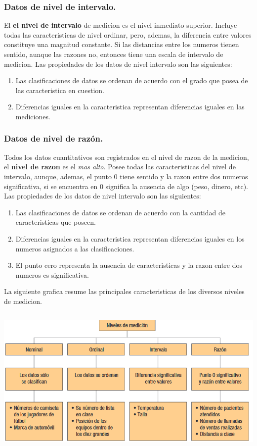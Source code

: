 \documentclass[]{article}
\begin{document}
\subsubsection*{Datos de nivel de intervalo.}
El \textbf{el nivel de intervalo} de medicion es el nivel inmediato superior. Incluye todas las caracteristicas de nivel ordinar, pero, ademas, la diferencia entre valores constituye una magnitud constante. Si las distancias entre los numeros tienen sentido, aunque las razones no, entonces tiene una escala de intervalo de medicion. Las propiedades de los datos de nivel intervalo son las siguientes:
\begin{enumerate}
	\item Las clasificaciones de datos se ordenan de acuerdo con el grado que posea de las caracteristica en cuestion.
	\item Diferencias iguales en la caracteristica representan diferencias iguales en las mediciones.
\end{enumerate}

\subsubsection*{Datos de nivel de razón.}
Todos los datos cuantitativos son registrados en el nivel de razon de la medicion, el \textbf{nivel de razon} es el \textit{mas alto}. Posee todas las caracteristicas del nivel de intervalo, aunque, ademas, el punto 0 tiene sentido y la razon entre dos numeros significativa, si se encuentra en 0 significa la ausencia de algo (peso, dinero, etc). Las propiedades de los datos de nivel intervalo son las siguientes:
\begin{enumerate}
	\item Las clasificaciones de datos se ordenan de acuerdo con la cantidad de caracteristicas que poseen.
	\item Diferencias iguales en la caracteristica representan diferencias iguales en los numeros asignados a las clasificaciones.
	\item El punto cero representa la ausencia de caracteristicas y la razon entre dos numeros es significativa.
\end{enumerate}
La siguiente grafica resume las principales caracteristicas de los diversos niveles de medicion.
\\
\includegraphics[width=16cm, height=8cm]{resumenCaracteristicasNivelesMedicion1_3}
\end{document}
